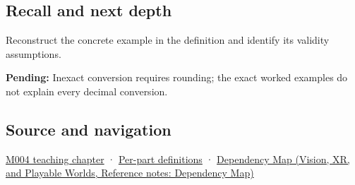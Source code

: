 \subsection{Recall and next depth}\label{appendix-6854d0e2218e-recall-and-next-depth}

Reconstruct the concrete example in the definition and identify its validity assumptions.

\textbf{Pending:} Inexact conversion requires rounding; the exact worked examples do not explain every decimal conversion.

\subsection{Source and navigation}\label{appendix-6854d0e2218e-source-and-navigation}

\hyperref[01-foundations-i-ch001-a-stretching-ruler-for-real-valued-quantities]{M004 teaching chapter} · \hyperref[appendix-fd090d982a15-m004---parts-61-76]{Per-part definitions} · \href{../07-Vision-XR-and-Playable-Worlds/main.pdf\#nameddest=appendix-4ad47bdd269a}{Dependency Map (Vision, XR, and Playable Worlds, Reference notes: Dependency Map)}
